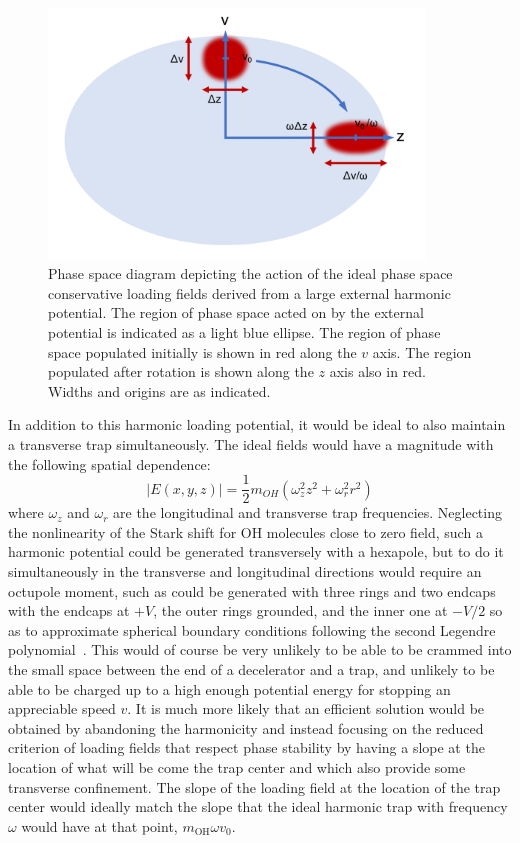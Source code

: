 \documentclass[defaultstyle,11pt]{thesis}
\begin{document}
\begin{figure}[t!]
\centering
\includegraphics[width=10cm]{LoadingRotation.png}
\caption[Ideal Trap Loading as a Quarter Rotation]{\label{LoadingRotation}
Phase space diagram depicting the action of the ideal phase space conservative loading fields derived from a large external harmonic potential. The region of phase space acted on by the external potential is indicated as a light blue ellipse. The region of phase space populated initially is shown in red along the $v$ axis. The region populated after rotation is shown along the $z$ axis also in red. Widths and origins are as indicated.
}
\end{figure}

In addition to this harmonic loading potential, it would be ideal to also maintain a transverse trap simultaneously. 
The ideal fields would have a magnitude with the following spatial dependence:
\begin{equation}
|E(x,y,z)| = \frac{1}{2}m_{OH}\left(\omega_z^2z^2 + \omega_r^2r^2\right)
\end{equation}
where $\omega_z$ and $\omega_r$ are the longitudinal and transverse trap frequencies.
Neglecting the nonlinearity of the Stark shift for OH molecules close to zero field, such a harmonic potential could be generated transversely with a hexapole, but to do it simultaneously in the transverse and longitudinal directions would require an octupole moment, such as could be generated with three rings and two endcaps with the endcaps at $+V$, the outer rings grounded, and the inner one at $-V/2$ so as to approximate spherical boundary conditions following the second Legendre polynomial~\cite{jackson1999classical}.
This would of course be very unlikely to be able to be crammed into the small space between the end of a decelerator and a trap, and unlikely to be able to be charged up to a high enough potential energy for stopping an appreciable speed $v$.
It is much more likely that an efficient solution would be obtained by abandoning the harmonicity and instead focusing on the reduced criterion of loading fields that respect phase stability by having a slope at the location of what will be come the trap center and which also provide some transverse confinement.
The slope of the loading field at the location of the trap center would ideally match the slope that the ideal harmonic trap with frequency $\omega$ would have at that point, $m_\text{OH}\omega v_0$.
\end{document}
